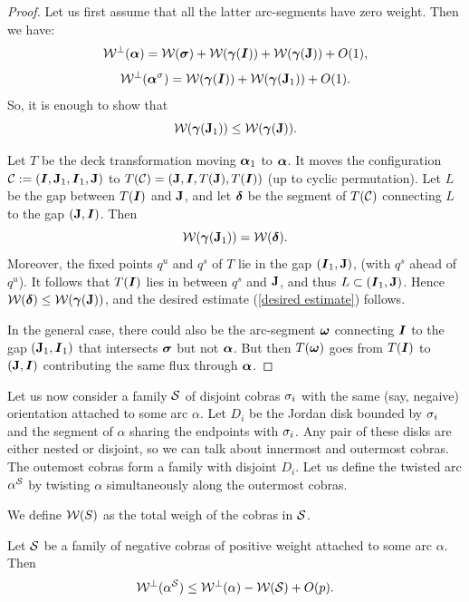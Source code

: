 {{\begin{proof}
 Let us first assume that all the latter arc-segments have zero weight.
 Then we have:
$$
   {\mathcal W}^\perp({\mbox{\boldmath$\alpha$} }) = {\mathcal W}({\boldsymbol{\sigma}}) + {\mathcal W}({\boldsymbol{\gamma}}({\boldsymbol{I}})) + {\mathcal W}({\boldsymbol{\gamma}}({\mathbf{J}})) + O(1),  
$$    
$$
   {\mathcal W}^\perp({\mbox{\boldmath$\alpha$} }^{\sigma}) = {\mathcal W}({\boldsymbol{\gamma}}({\boldsymbol{I}}))  + {\mathcal W}({\boldsymbol{\gamma}}({\mathbf{J}}_1)) +O(1). 
$$      
So, it is enough to show that
\begin{equation}\label{desired estimate} 
   {\mathcal W}({\boldsymbol{\gamma}}({\mathbf{J}}_1)) \leq {\mathcal W}({\boldsymbol{\gamma}}({\mathbf{J}}) ).
\end{equation} 

Let $T$ be the deck transformation moving ${\mbox{\boldmath$\alpha$} }_1$ to ${\mbox{\boldmath$\alpha$} }$. 
It moves the configuration ${\mathcal C}:=({\boldsymbol{I}}, {\mathbf{J}}_1, {\boldsymbol{I}}_1, {\mathbf{J}})$ to 
$T({\mathcal C})= ({\mathbf{J}}, {\boldsymbol{I}},  T({\mathbf{J}}),   T({\boldsymbol{I}}) ) $ (up to cyclic permutation).
Let $L$ be the gap  between $T({\boldsymbol{I}})$ and ${\mathbf{J}}$, and let ${\boldsymbol{\delta}}$ be the
segment of $T({\mathcal C})$  connecting $L$ to  the gap $({\mathbf{J}}, {\boldsymbol{I}})$. 
Then 
$$
  {\mathcal W}({\boldsymbol{\gamma}}({\mathbf{J}}_1)) = {\mathcal W}({\boldsymbol{\delta}}).  
$$
Moreover,  the  fixed points $q^u$ and $q^s$ of $T$ lie in the gap $({\boldsymbol{I}}_1, {\mathbf{J}})$,
(with $q^s$ ahead of $q^u$). 
It follows that $T({\boldsymbol{I}})$ lies in  between $q^s$ and ${\mathbf{J}}$,
and thus  $L\subset ({\boldsymbol{I}}_1, {\mathbf{J}})$.
Hence ${\mathcal W}({\boldsymbol{\delta}}) \leq {\mathcal W}({\boldsymbol{\gamma}}({\mathbf{J}}) )$, and 
the desired estimate (\ref{desired estimate}) follows. 

\msk In the general case, there could also be the arc-segment $\boldsymbol{{\omega}}$ connecting
${\boldsymbol{I}}$ to the gap $({\mathbf{J}}_1, {\boldsymbol{I}}_1)$ that intersects ${\boldsymbol{\sigma}}$ but not
${\mbox{\boldmath$\alpha$} }$. 
But then $T(\boldsymbol{{\omega}})$ goes from $T({\boldsymbol{I}})$ to $({\mathbf{J}}, {\boldsymbol{I}})$  contributing
the same flux through ${\mbox{\boldmath$\alpha$} }$.
\end{proof}

 Let us now consider  a family ${\mathcal S}$ of disjoint cobras ${\sigma}_i$ with
 the same (say, negaive) orientation attached to
 some arc $\alpha$. Let $D_i$ be the Jordan disk bounded by ${\sigma}_i$ and
 the segment of $\alpha$ sharing the endpoints with ${\sigma}_i$.   
Any pair of these disks are  either nested or disjoint,
so we can talk about  innermost and outermost cobras. 
The outemost cobras form a  family with disjoint $D_i$.
Let us define the twisted arc $\alpha^{\mathcal S}$ 
by twisting $\alpha$ simultaneously  along the outermost cobras. 

We define ${\mathcal W}(S)$ as the total weigh of the cobras in ${\mathcal S}$. 

\begin{cor}\label{loss of several cobras}
Let  ${\mathcal S}$ be a family of negative cobras of positive weight attached to some arc $\alpha$. Then 
$$
 {\mathcal W}^\perp (\alpha^{\mathcal S})  \leq  {\mathcal W}^\perp (\alpha) - {\mathcal W}( {\mathcal S} ) + O(p).
$$
\end{cor}

}}
